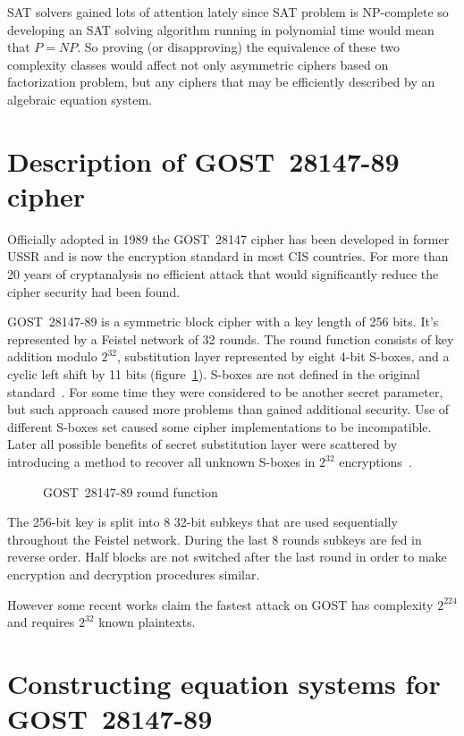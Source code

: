 SAT solvers gained lots of attention lately since SAT problem is
\mbox{NP-complete} so
developing an SAT solving algorithm running in polynomial time would mean that
$P = NP$. So proving (or disapproving) the equivalence of these two complexity
classes would affect not only asymmetric ciphers based on factorization
problem, but any ciphers that may be efficiently described by an algebraic
equation system.
 
\section{Description of GOST~28147-89 cipher}
\label{sec:algebraic-gost}

Officially adopted in 1989 the GOST~28147 cipher has been developed in
former USSR and is now the encryption standard in most CIS countries.
For more than 20 years of cryptanalysis no efficient attack that would
significantly reduce the cipher security had been found. 

GOST~28147-89 is a symmetric block cipher with a key length of 256 bits. It's
represented by a Feistel network of 32 rounds. The round function consists of
key addition modulo $2^{32}$, substitution layer represented by eight 4-bit
S-boxes, and a cyclic left shift by 11 bits (figure~\ref{fig:gost-round-func}). S-boxes are not defined in the 
original standard~\cite{GOST28147}. For some time they were considered to be
another secret parameter, but such approach caused more problems than gained
additional security. Use of different S-boxes set caused some cipher
implementations to be incompatible. Later all possible benefits of secret
substitution layer were scattered by introducing a method to recover all
unknown S-boxes in $2^{32}$ encryptions~\cite{saarinen1998:sboxes}.
\begin{figure}[htbp]
	\centering
    
	\caption{GOST~28147-89 round function}
	\label{fig:gost-round-func}
\end{figure}
The 256-bit key is split into 8 32-bit subkeys that are used sequentially
throughout the Feistel network. During the last 8 rounds subkeys are fed in
reverse order. Half blocks are not switched after the last round in order to
make encryption and decryption procedures similar.

 However some recent works 
\cite{cryptoeprint:2011:626, Courtois:cryptoeprint_2011} claim the fastest attack on
GOST has complexity $2^{224}$ and requires $2^{32}$ known plaintexts. 

\section{Constructing equation systems for GOST~28147-89}

